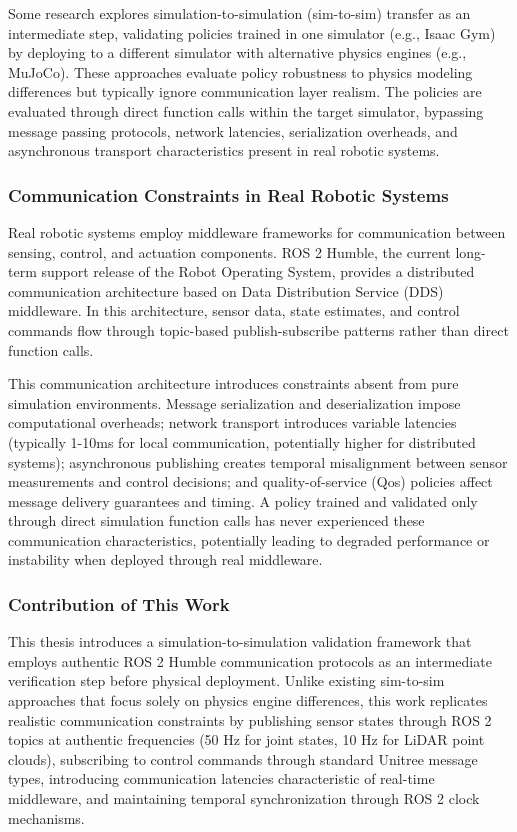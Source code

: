 \documentclass[12pt,a4paper]{article}
\begin{document}
Some research explores simulation-to-simulation (sim-to-sim) transfer as an intermediate step, validating policies trained in one simulator (e.g., Isaac Gym) by deploying to a different simulator with alternative physics engines (e.g., MuJoCo). These approaches evaluate policy robustness to physics modeling differences but typically ignore communication layer realism. The policies are evaluated through direct function calls within the target simulator, bypassing message passing protocols, network latencies, serialization overheads, and asynchronous transport characteristics present in real robotic systems.

\subsubsection{Communication Constraints in Real Robotic Systems}

Real robotic systems employ middleware frameworks for communication between sensing, control, and actuation components. ROS 2 Humble, the current long-term support release of the Robot Operating System, provides a distributed communication architecture based on Data Distribution Service (DDS) middleware. In this architecture, sensor data, state estimates, and control commands flow through topic-based publish-subscribe patterns rather than direct function calls.

This communication architecture introduces constraints absent from pure simulation environments. Message serialization and deserialization impose computational overheads; network transport introduces variable latencies (typically 1-10ms for local communication, potentially higher for distributed systems); asynchronous publishing creates temporal misalignment between sensor measurements and control decisions; and quality-of-service (Qos) policies affect message delivery guarantees and timing. A policy trained and validated only through direct simulation function calls has never experienced these communication characteristics, potentially leading to degraded performance or instability when deployed through real middleware.

\subsubsection{Contribution of This Work}

This thesis introduces a simulation-to-simulation validation framework that employs authentic ROS 2 Humble communication protocols as an intermediate verification step before physical deployment. Unlike existing sim-to-sim approaches that focus solely on physics engine differences, this work replicates realistic communication constraints by publishing sensor states through ROS 2 topics at authentic frequencies (50 Hz for joint states, 10 Hz for LiDAR point clouds), subscribing to control commands through standard Unitree message types, introducing communication latencies characteristic of real-time middleware, and maintaining temporal synchronization through ROS 2 clock mechanisms.
\end{document}
